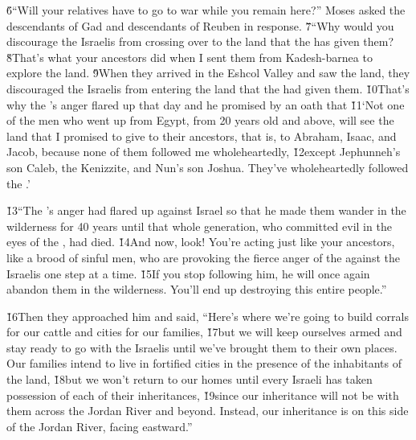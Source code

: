 \v{6}``Will your relatives have to go to war while you remain here?'' Moses asked the descendants of Gad and descendants of Reuben in response. \v{7}``Why would you discourage the Israelis from crossing over to the land that the  has given them? \v{8}That's what your ancestors did when I sent them from Kadesh-barnea to explore the land. \v{9}When they arrived in the Eshcol Valley and saw the land, they discouraged the Israelis from entering the land that the  had given them. \v{10}That's why the 's anger flared up that day and he promised by an oath that \v{11}`Not one of the men who went up from Egypt, from 20 years old and above, will see the land that I promised to give to their ancestors, that is, to Abraham, Isaac, and Jacob, because none of them followed me wholeheartedly, \v{12}except Jephunneh's son Caleb, the Kenizzite, and Nun's son Joshua. They've wholeheartedly followed the .'

\v{13}``The 's anger had flared up against Israel so that he made them wander in the wilderness for 40 years until that whole generation, who committed evil in the eyes of the , had died. \v{14}And now, look! You're acting just like your ancestors, like a brood of sinful men, who are provoking the fierce anger of the  against the Israelis one step at a time. \v{15}If you stop following him, he will once again abandon them in the wilderness. You'll end up destroying this entire people.''

\v{16}Then they approached him and said, ``Here's where we're going to build corrals for our cattle and cities for our families, \v{17}but we will keep ourselves armed and stay ready to go with the Israelis until we've brought them to their own places. Our families intend to live in fortified cities in the presence of the inhabitants of the land, \v{18}but we won't return to our homes until every Israeli has taken possession of each of their inheritances, \v{19}since our inheritance will not be with them across the Jordan River and beyond. Instead, our inheritance is on this side of the Jordan River, facing eastward.''

